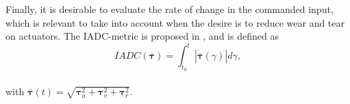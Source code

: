 Finally, it is desirable to evaluate the rate of change in the commanded input, which is relevant to take into account when the desire is to reduce wear and tear on actuators. The IADC-metric is proposed in \cite{}, and is defined as 
\begin{equation}
IADC(\bar{\boldsymbol{\tau}}) = \int_{t_0}^{t} \left|\dot{\bar{\boldsymbol{\tau}}}(\gamma)\right|d\gamma,
\end{equation}\\
with $\bar{\boldsymbol{\tau}}(t) = \sqrt{\boldsymbol{\tau}_u^2+\boldsymbol{\tau}_v^2+\boldsymbol{\tau}_r^2}$.
\cleardoublepage
